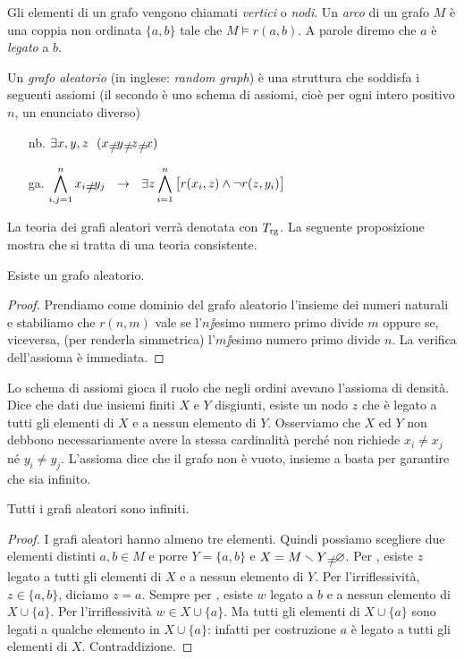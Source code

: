 Gli elementi di un grafo vengono chiamati \emph{vertici\/} o \emph{nodi}. Un \emph{arco\/} di un grafo $M$ \`e una coppia non ordinata $\{a,b\}$ tale che $M\models r(a,b)$. A parole diremo che $a$ \`e \emph{legato\/} a $b$.

Un \emph{grafo aleatorio\/} (in inglese: \emph{random graph}) \`e una struttura che soddisfa i seguenti assiomi (il secondo \`e uno schema di assiomi, cio\`e per ogni intero positivo $n$, un enunciato diverso)
\begin{itemize}
\item[nb.] $\E x,y,z\ \ (x\neq y\neq z\neq x)$
\item[ga.] $\displaystyle\bigwedge^n_{i,j=1} x_i\neq y_j\ \ \imp\ \ \E z \bigwedge^n_{i=1} \big[r(x_i,z) \wedge \neg r(z,y_i)\big]$
\end{itemize}

La teoria dei grafi aleatori verr\`a denotata con \emph{$T_{\rm rg}$}. La seguente proposizione mostra che si tratta di una teoria consistente.

\begin{proposition}
Esiste un grafo aleatorio.
\end{proposition}
\begin{proof}
Prendiamo come dominio del grafo aleatorio l'insieme dei numeri naturali e stabiliamo che $r(n,m)$ vale se l'$n\jj$esimo numero primo divide $m$ oppure se, viceversa, (per renderla simmetrica) l'$m\jj$esimo numero primo divide $n$. La verifica dell'assioma  \`e immediata.
\end{proof}

Lo schema di assiomi  gioca il ruolo che negli ordini avevano l'assioma di densit\`a. Dice che dati due insiemi finiti $X$ e $Y$ disgiunti, esiste un nodo $z$ che \`e legato a tutti gli elementi di $X$ e a nessun elemento di $Y$. Osserviamo che $X$ ed $Y$ non debbono necessariamente avere la stessa cardinalit\`a perch\'e  non richiede $x_i\neq x_j$ n\'e  $y_i\neq y_j$. L'assioma  dice che il grafo non \`e vuoto, insieme a  basta per garantire che sia infinito.

\begin{proposition}
Tutti i grafi aleatori sono infiniti.
\end{proposition}
\begin{proof}
I grafi aleatori hanno almeno tre elementi. Quindi possiamo scegliere due elementi distinti $a,b\in M$ e porre $Y=\{a,b\}$ e $X=M\sm Y\neq \0$.  Per , esiste $z$ legato a tutti gli elementi di $X$ e a nessun elemento di $Y$. Per l'irriflessivit\`a, $z\in\{a,b\}$, diciamo $z=a$. Sempre per , esiste $w$ legato a $b$ e a nessun elemento di $X\cup\{a\}$. Per l'irriflessivit\`a $w\in X\cup\{a\}$. Ma tutti gli elementi di $X\cup\{a\}$ sono legati a qualche elemento in $X\cup\{a\}$: infatti per costruzione $a$ \`e legato a tutti gli elementi di $X$. Contraddizione.
\end{proof}

